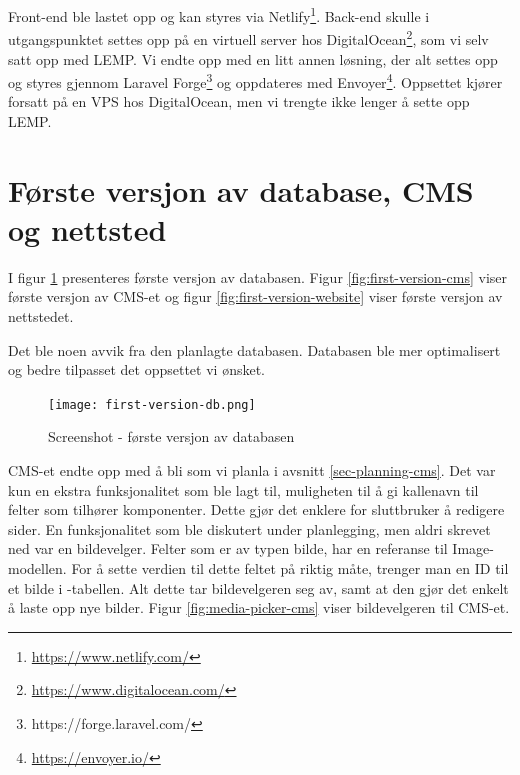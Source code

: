 Front-end ble lastet opp og kan styres via Netlify\footnote{\url{https://www.netlify.com/}}. Back-end skulle i utgangspunktet settes opp på en virtuell server hos DigitalOcean\footnote{\url{https://www.digitalocean.com/}}, som vi selv satt opp med LEMP. Vi endte opp med en litt annen løsning, der alt settes opp og styres gjennom Laravel Forge\footnote{https://forge.laravel.com/} og oppdateres med Envoyer\footnote{\url{https://envoyer.io/}}. Oppsettet kjører forsatt på en VPS hos DigitalOcean, men vi trengte ikke lenger å sette opp LEMP.

\section{Første versjon av database, CMS og nettsted}
I figur \ref{fig:first-version-db} presenteres første versjon av databasen. Figur \ref{fig:first-version-cms} viser første versjon av CMS-et og figur \ref{fig:first-version-website} viser første versjon av nettstedet.


Det ble noen avvik fra den planlagte databasen. Databasen ble mer optimalisert og bedre tilpasset det oppsettet vi ønsket.





\begin{figure}[H]
    \centering
    \texttt{[image: first-version-db.png]}
    \caption{Screenshot - første versjon av databasen}
    \label{fig:first-version-db}
\end{figure}


CMS-et endte opp med å bli som vi planla i avsnitt \ref{sec-planning-cms}. Det var kun en ekstra funksjonalitet som ble lagt til, muligheten til å gi kallenavn til felter som tilhører komponenter. Dette gjør det enklere for sluttbruker å redigere sider. En funksjonalitet som ble diskutert under planlegging, men aldri skrevet ned var en bildevelger. Felter som er av typen bilde, har en referanse til Image-modellen. For å sette verdien til dette feltet på riktig måte, trenger man en ID til et bilde i -tabellen. Alt dette tar bildevelgeren seg av, samt at den gjør det enkelt å laste opp nye bilder. Figur \ref{fig:media-picker-cms} viser bildevelgeren til CMS-et.

